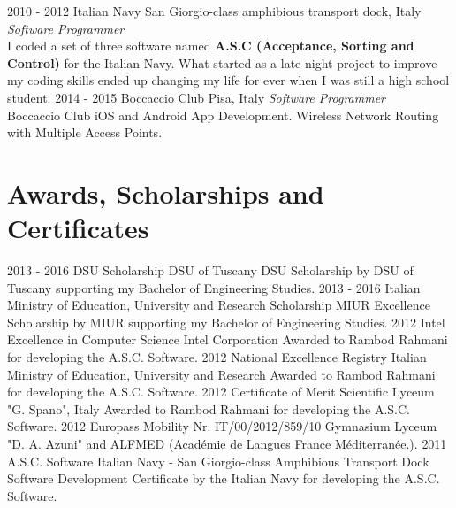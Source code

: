 \documentclass[]{friggeri-cv}
\begin{document}
\begin{entrylist}
\entry
{2010 - 2012}
{Italian Navy}
{San Giorgio-class amphibious transport dock, Italy}
{\emph{Software Programmer} \\
I coded a set of three software named \textbf{A.S.C (Acceptance, Sorting and Control)} for the Italian Navy. What started as a late night project to improve my coding skills ended up changing my life for ever when I was still a high school student.}
\entry
{2014 - 2015}
{Boccaccio Club}
{Pisa, Italy}
{\emph{Software Programmer} \\
Boccaccio Club iOS and Android App Development. Wireless Network Routing with Multiple Access Points.}
\end{entrylist}


\section{Awards, Scholarships and Certificates}
\vspace{-3mm}
\begin{entrylist}
\entry
{2013 - 2016}
{DSU Scholarship}
{DSU of Tuscany}
{DSU Scholarship by DSU of Tuscany supporting my Bachelor of Engineering Studies.}
\entry
{2013 - 2016}
{Italian Ministry of Education, University and Research Scholarship}
{MIUR}
{Excellence Scholarship by MIUR supporting my Bachelor of Engineering Studies.}
\entry
{2012}
{Intel Excellence in Computer Science}
{Intel Corporation}
{Awarded to Rambod Rahmani for developing the A.S.C. Software.}
\entry
{2012}
{National Excellence Registry}
{Italian Ministry of Education, University and Research}
{Awarded to Rambod Rahmani for developing the A.S.C. Software.}
\entry
{2012}
{Certificate of Merit}
{Scientific Lyceum "G. Spano", Italy}
{Awarded to Rambod Rahmani for developing the A.S.C. Software.}
\entry
{2012}
{Europass Mobility Nr. IT/00/2012/859/10}
{}
{Gymnasium Lyceum "D. A. Azuni" and ALFMED (Acad\'emie de Langues France M\'editerran\'ee.).}
\entry
{2011}
{A.S.C. Software}
{Italian Navy - San Giorgio-class Amphibious Transport Dock}
{Software Development Certificate by the Italian Navy for developing the A.S.C. Software.}
\end{entrylist}
\end{document}
